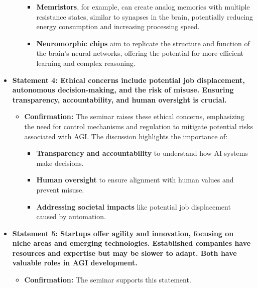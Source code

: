 \documentclass[
]{article}
\begin{document}
\begin{itemize}
\begin{itemize}
    \begin{itemize}
    
    \item
      \textbf{Memristors}, for example, can create analog memories with
      multiple resistance states, similar to synapses in the brain,
      potentially reducing energy consumption and increasing processing
      speed.
    \item
      \textbf{Neuromorphic chips} aim to replicate the structure and
      function of the brain's neural networks, offering the potential
      for more efficient learning and complex reasoning.
    \end{itemize}
  \end{itemize}
\item
  \textbf{Statement 4: Ethical concerns include potential job
  displacement, autonomous decision-making, and the risk of misuse.
  Ensuring transparency, accountability, and human oversight is
  crucial.}

  \begin{itemize}
  
  \item
    \textbf{Confirmation:} The seminar raises these ethical concerns,
    emphasizing the need for control mechanisms and regulation to
    mitigate potential risks associated with AGI. The discussion
    highlights the importance of:

    \begin{itemize}
    
    \item
      \textbf{Transparency and accountability} to understand how AI
      systems make decisions.
    \item
      \textbf{Human oversight} to ensure alignment with human values and
      prevent misuse.
    \item
      \textbf{Addressing societal impacts} like potential job
      displacement caused by automation.
    \end{itemize}
  \end{itemize}
\item
  \textbf{Statement 5: Startups offer agility and innovation, focusing
  on niche areas and emerging technologies. Established companies have
  resources and expertise but may be slower to adapt. Both have valuable
  roles in AGI development.}

  \begin{itemize}
  
  \item
    \textbf{Confirmation:} The seminar supports this statement.


\end{itemize}
\end{itemize}
\end{document}

